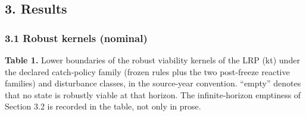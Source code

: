 \subsection{3. Results}\label{budget-results}

\subsubsection{3.1 Robust kernels
(nominal)}\label{budget-robust-kernels-nominal}

\textbf{Table 1.} Lower boundaries of the robust viability kernels of
the LRP (kt) under the declared catch-policy family (frozen rules plus
the two post-freeze reactive families) and disturbance classes, in the
source-year convention. ``empty'' denotes that no state is robustly
viable at that horizon. The infinite-horizon emptiness of Section 3.2 is
recorded in the table, not only in prose.

